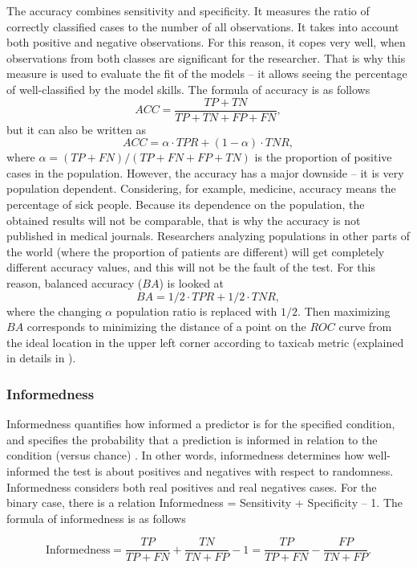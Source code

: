 \documentclass[english]{pwr_wmat_praca_dyplomowa}
\theoremstyle{plain}
\numberwithin{theorem}{chapter}
\theoremstyle{definition}
\numberwithin{theorem}{chapter}
\begin{document}
	The accuracy combines sensitivity and specificity. It measures the ratio of correctly classified cases to the number of all observations. It takes into account both positive and negative observations. For this reason, it copes very well, when observations from both classes are significant for the researcher. That is why this measure is used to evaluate the fit of the models -- it allows seeing the percentage of well-classified by the model skills. The formula of accuracy is as follows
	$$ ACC = \frac{TP + TN}{TP + TN + FP + FN},$$
	but it can also be written as
	$$ ACC = \alpha \cdot TPR + (1-\alpha) \cdot TNR, $$
	where $\alpha = (TP+FN)/(TP+FN+FP+TN)$ is the proportion of positive cases in the population. However, the accuracy has a major downside -- it is very population dependent. Considering, for example, medicine, accuracy means the percentage of sick people. Because its dependence on the population, the obtained results will not be comparable, that is why the accuracy is not published in medical journals. Researchers analyzing populations in other parts of the world (where the proportion of patients are different) will get completely different accuracy values, and this will not be the fault of the test. For this reason, balanced accuracy ($BA$) is looked at 
	$$ BA = 1/2 \cdot TPR + 1/2 \cdot TNR,$$
	where the changing $\alpha$ population ratio is replaced with $1/2$. Then maximizing $BA$ corresponds to minimizing the distance of a point on the $ROC$ curve from the ideal location in the upper left corner according to taxicab metric (explained in details in \cite{powers2011evaluation}). 
	
	\subsubsection{Informedness}
	
	Informedness quantifies how informed a predictor is for the specified condition, and specifies the probability that a prediction is informed in relation to the condition (versus chance) \cite{powers2011evaluation}. In other words, informedness determines how well-informed the test is about positives and negatives with respect to randomness. Informedness considers both real positives and real negatives cases. For the binary case, there is a relation Informedness = Sensitivity + Specificity – 1. The formula of informedness is as follows
	
	$$ \text{Informedness} = \frac{TP}{TP + FN}  +  \frac{TN}{TN + FP} - 1 = \frac{TP}{TP + FN} - \frac{FP}{TN + FP}. $$
	
\end{document}
